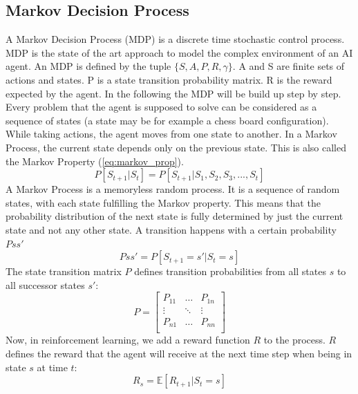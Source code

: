 \documentclass[12pt,a4paper]{article}
\begin{document}
\subsection{Markov Decision Process}
A Markov Decision Process (MDP) is a discrete time stochastic control process. MDP is the state of the art approach to model the complex environment of an AI agent. An MDP is defined by the tuple ${\{S, A, P, R, \gamma\}}$. A and S are finite sets of actions and states. P is a state transition probability matrix. R is the reward expected by the agent. In the following the MDP will be build up step by step. \newline
Every problem that the agent is supposed to solve can be considered as a sequence of states (a state may be for example a chess board configuration). While taking actions, the agent moves from one state to another. In a Markov Process, the current state depends only on the previous state. This is also called the Markov Property (\ref{eq:markov_prop}).
\begin{equation}
    \label{eq:markov_prop}
    P[S_{t+1}|S_t] = P[S_{t+1}|S_1,S_2,S_3,...,S_t]
\end{equation}
A Markov Process is a memoryless random process. It is a sequence of random states, with each state fulfilling the Markov property. This means that the probability distribution of the next state is fully determined by just the current state and not any other state. A transition happens with a certain probability ${Pss'}$
\begin{equation}
    \label{eq:trans_prob}
    Pss' = P[S_{t+1} = s' | S_t =s]
\end{equation}
The state transition matrix ${P}$ defines transition probabilities from all states $s$ to all successor states ${s'}$:
\begin{equation}
    \label{eq:trans_matrix}
    P = \begin{bmatrix}
        P_{11} & \dots & P_{1n}\\
        \vdots & \ddots & \vdots\\
        P_{n1} & \dots & P_{nn}\\
    \end{bmatrix}
\end{equation}
Now, in reinforcement learning, we add a reward function ${R}$ to the process.  ${R}$ defines the reward that the agent will receive at the next time step when being in state $s$ at time $t$:
\begin{equation}
    \label{eq:reward_func}
    R_s = \mathbb{E}[R_{t+1}|S_t = s]
\end{equation}
\end{document}
